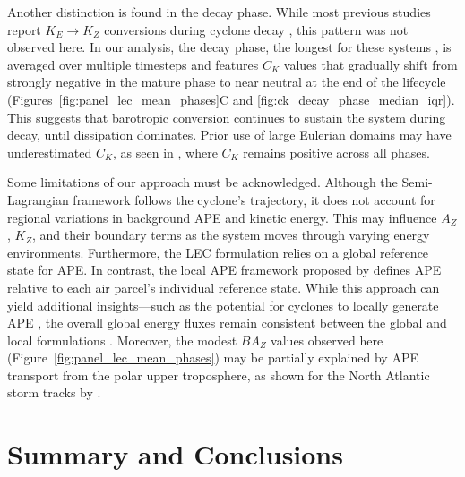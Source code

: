 \documentclass[pdflatex,sn-chicago]{sn-jnl}%
\theoremstyle{plain}
\theoremstyle{definition}
\theoremstyle{remark}
\theoremstyle{definition}
\begin{document}
Another distinction is found in the decay phase. While most previous studies report $K_E \rightarrow K_Z$ conversions during cyclone decay \citep[e.g.,][]{dias2011energy,veiga2008analysis,pezza2014large}, this pattern was not observed here. In our analysis, the decay phase, the longest for these systems \citep{couto2024new}, is averaged over multiple timesteps and features $C_K$ values that gradually shift from strongly negative in the mature phase to near neutral at the end of the lifecycle (Figures~\ref{fig:panel_lec_mean_phases}C and \ref{fig:ck_decay_phase_median_iqr}). This suggests that barotropic conversion continues to sustain the system during decay, until dissipation dominates. Prior use of large Eulerian domains may have underestimated $C_K$, as seen in \citet{black2013universal}, where $C_K$ remains positive across all phases.

Some limitations of our approach must be acknowledged. Although the Semi-Lagrangian framework follows the cyclone's trajectory, it does not account for regional variations in background APE and kinetic energy. This may influence $A_Z$, $K_Z$, and their boundary terms as the system moves through varying energy environments. Furthermore, the LEC formulation relies on a global reference state for APE. In contrast, the local APE framework proposed by \citet{novak2018local} defines APE relative to each air parcel’s individual reference state. While this approach can yield additional insights—such as the potential for cyclones to locally generate APE \citep{federer2024local}, the overall global energy fluxes remain consistent between the global and local formulations \citep{liu2024systematic}. Moreover, the modest $BA_Z$ values observed here (Figure~\ref{fig:panel_lec_mean_phases}) may be partially explained by APE transport from the polar upper troposphere, as shown for the North Atlantic storm tracks by \citet{federer2025synoptic}.

\section{Summary and Conclusions}\label{sec:conclusion}
\end{document}
